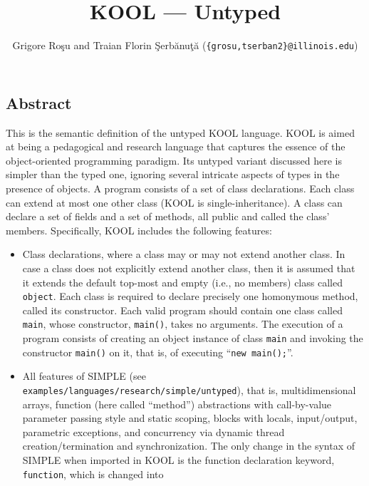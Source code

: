 \setlength{\parindent}{1em}
\title{KOOL --- Untyped}
\author{Grigore Ro\c{s}u and 
        Traian Florin \c{S}erb\u{a}nu\c{t}\u{a}
        (\texttt{\{grosu,tserban2\}@illinois.edu})}

\maketitle

\begin{latexComment}
\section{Abstract}
This is the \K semantic definition of the untyped KOOL language.
KOOL is aimed at being a pedagogical and research language that
captures the essence of the object-oriented programming paradigm.
Its untyped variant discussed here is simpler than the typed one,
ignoring several intricate aspects of types in the
presence of objects.  A program consists of a set of class declarations.
Each class can extend at most one other class (KOOL is single-inheritance).
A class can declare a set of fields and a set of methods, all public and
called the class' members.
Specifically, KOOL includes the following features:
\begin{itemize}
\item Class declarations, where a class may or may not extend another class.
In case a class does not explicitly extend another class, then it is assumed
that it extends the default top-most and empty (i.e., no members)
class called \texttt{object}.  Each class is required to declare precisely one
homonymous method, called its constructor.  Each valid program should contain
one class called \texttt{main}, whose constructor, \texttt{main()}, takes no
arguments.  The execution of a program consists of creating an object instance
of class \texttt{main} and invoking the constructor \texttt{main()} on it,
that is, of executing ``\texttt{new main();}''.
\item All features of SIMPLE (see
{\footnotesize\texttt{examples/languages/research/simple/untyped}}),
that is, multidimensional arrays, function (here called ``method'')
abstractions with call-by-value parameter passing style and static
scoping, blocks with locals, input/output, parametric exceptions, and
concurrency via dynamic thread creation/termination and synchronization.  
The only change in the syntax of SIMPLE when imported in KOOL is the
function declaration keyword, \texttt{function}, which is changed into

\end{itemize}
\end{latexComment}
